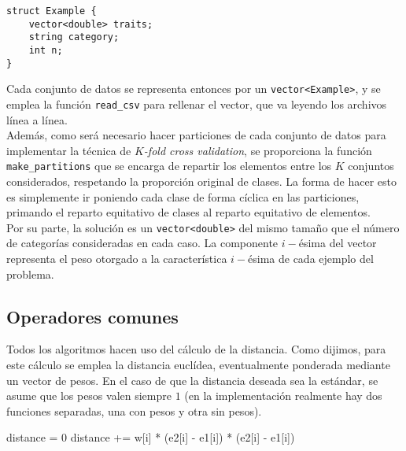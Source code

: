 \documentclass[12pt]{article}
\begin{document}
\begin{verbatim}
struct Example {
    vector<double> traits;
    string category;
    int n;
}
\end{verbatim}

Cada conjunto de datos se representa entonces por un \verb|vector<Example>|, y se emplea la función \verb|read_csv| para rellenar el vector, que va leyendo los archivos línea a línea.\\ 

Además, como será necesario hacer particiones de cada conjunto de datos para implementar la técnica de \textit{$K$-fold cross validation}, se proporciona la función \verb|make_partitions| que se encarga de repartir los elementos entre los $K$ conjuntos considerados, respetando la proporción original de clases. La forma de hacer esto es simplemente ir poniendo cada clase de forma cíclica en las particiones, primando el reparto equitativo de clases al reparto equitativo de elementos.\\

Por su parte, la solución es un \verb|vector<double>| del mismo tamaño que el número de categorías consideradas en cada caso. La componente $i-$ésima del vector representa el peso otorgado a la característica $i-$ésima de cada ejemplo del problema.

\subsection*{Operadores comunes}

Todos los algoritmos hacen uso del cálculo de la distancia. Como dijimos, para este cálculo se emplea la distancia euclídea, eventualmente ponderada mediante un vector de pesos. En el caso de que la distancia deseada sea la estándar, se asume que los pesos valen siempre $1$ (en la implementación realmente hay dos funciones separadas, una con pesos y otra sin pesos).\\

\newpage 

\begin{algorithm}[h]
\begin{algorithmic}

     
     \State distance = $0$
       
            \State distance += w[i] * (e2[i] - e1[i]) * (e2[i] - e1[i])
\EndFunction
\end{algorithmic}
\end{algorithm}
\end{document}
